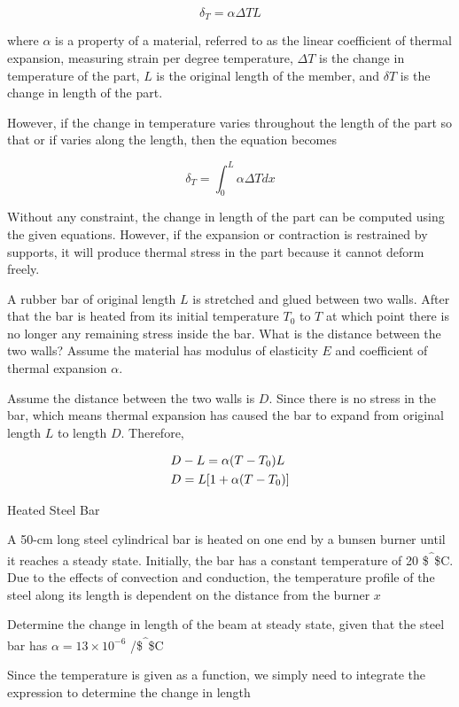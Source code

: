 \documentclass[a4paper,openany,12pt]{book}
\begin{document}
$$\delta _T = \alpha \Delta TL$$

where \(\alpha\) is a property of a material, referred to as the linear
coefficient of thermal expansion, measuring strain per degree
temperature, \(\Delta T\) is the change in temperature of the part, \(L\) is
the original length of the member, and \(\delta T\) is the change in
length of the part.

However, if the change in temperature varies throughout the length of
the part so that or if varies along the length, then the equation
becomes

$$\delta _T = \int_0^L \alpha \Delta Tdx$$

Without any constraint, the change in length of the part can be computed
using the given equations. However, if the expansion or contraction is
restrained by supports, it will produce thermal stress in the part
because it cannot deform freely.

A rubber bar of original length \(L\) is stretched and glued between two
walls. After that the bar is heated from its initial temperature \(T_0\)
to \(T\) at which point there is no longer any remaining stress inside the
bar. What is the distance between the two walls? Assume the material has
modulus of elasticity \(E\) and coefficient of thermal expansion \(\alpha\).


Assume the distance between the two walls is \(D\). Since there is no
stress in the bar, which means thermal expansion has caused the bar to
expand from original length \(L\) to length \(D\). Therefore,

$$\begin{gathered}
  D - L = \alpha (T - T_0)L \hfill \\
  D = L[1 + \alpha (T - T_0)] \hfill \\ 
\end{gathered}$$

Heated Steel Bar

A 50-cm long steel cylindrical bar is heated on one end by a bunsen
burner until it reaches a steady state. Initially, the bar has a
constant temperature of 20 \$\textsuperscript{\^{}}\$C. Due to the effects of convection
and conduction, the temperature profile of the steel along its length is
dependent on the distance from the burner \(x\)


Determine the change in length of the beam at steady state, given that
the steel bar has \(\alpha = 13 \times 10^{-6}\) /\$\textsuperscript{\^{}}\$C

Since the temperature is given as a function, we simply need to
integrate the expression to determine the change in length
\end{document}
